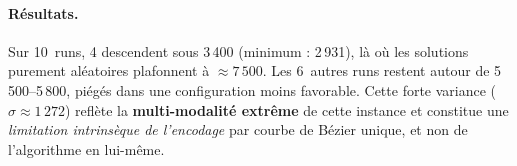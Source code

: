 \paragraph{Résultats.}
Sur 10~runs, 4 descendent sous 3\,400 (minimum : 2\,931), là où les solutions
purement aléatoires plafonnent à $\approx 7\,500$.  Les 6~autres runs restent
autour de 5\,500--5\,800, piégés dans une configuration moins favorable.  Cette
forte variance ($\sigma \approx 1\,272$) reflète la \textbf{multi-modalité
extrême} de cette instance et constitue une \emph{limitation intrinsèque de
l'encodage} par courbe de Bézier unique, et non de l'algorithme en lui-même.
